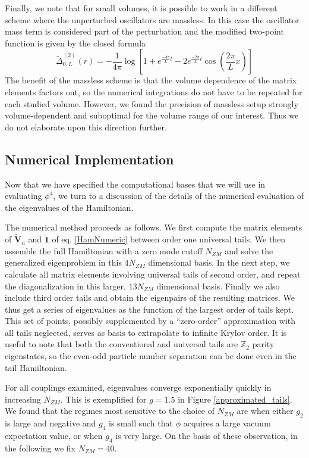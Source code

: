 \documentclass[twocolumn,secnumarabic,amssymb, nobibnotes, aps, prd]{revtex4-2}
\newcommand{\be}{\begin{equation}}
\newcommand{\ee}{\end{equation}}
\begin{document}
Finally, we note that for small volumes, it is possible to work in a different scheme where the unperturbed oscillators are massless. In this case the oscillator mass term is considered part of the perturbation and the modified two-point function is given by the closed formula
\be
\tilde{\Delta}^{(2)}_{0,L}(r)=-\frac{1}{4\pi}\log\left[1+e^{\frac{-4\pi}{L} t}-2e^{\frac{-2\pi}{L} t}\cos\left(\frac{2\pi}{L} x\right)\right]
\ee
The benefit of the massless scheme is that the volume dependence of the matrix elements factors out, so the numerical integrations do not have to be repeated for each studied volume. However, we found the precision of massless setup strongly volume-dependent and suboptimal for the volume range of our interest.  Thus we do not elaborate upon this direction further.



\subsection{Numerical Implementation} \label{SubsecNumImp}

Now that we have specified the computational bases that we will use in evaluating $\phi^4$, we turn to a discussion of the details of the numerical evaluation of the eigenvalues of the Hamiltonian. 

The numerical method proceeds as follows. We first
compute the matrix elements of $\tilde{\mathbf V}_n$ and $\widetilde{\mathbf{1}}$ of eq. \eqref{HamNumeric} between order one universal tails. We then assemble the full Hamiltonian with a zero mode cutoff $N_{ZM}$ and solve the generalized eigenproblem in this $4N_{ZM}$ dimensional basis. In the next step, we calculate all matrix elements involving universal tails of second order, and repeat the diagonalization in this larger, $13N_{ZM}$ dimensional basis. Finally we also include third order tails and obtain the eigenpairs of the resulting matrices. We thus get a series of eigenvalues as the function of the largest order of tails kept. This set of points, possibly supplemented by a ``zero-order” approximation with all tails neglected, serves as basis to extrapolate to infinite Krylov order. It is useful to note that both the conventional and universal tails are $\mathbb{Z}_2$ parity eigenstates, so the even-odd particle number separation can be done even in the tail Hamiltonian.




For all couplings examined, eigenvalues converge exponentially quickly in increasing $N_{ZM}$. This is exemplified for $g=1.5$ in Figure \ref{approximated_tails}. We found that the regimes most sensitive to the choice of $N_{ZM}$ are when either $g_2$ is large and negative and $g_4$ is small such that $\phi$ acquires a large vacuum expectation value, or when $g_4$ is very large.  On the basis of these observation, in the following we fix $N_{ZM}=40$.
\end{document}
